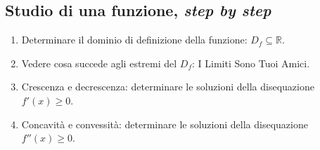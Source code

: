 \documentclass[12pt,a4paper]{article}
\begin{document}
\subsection{Studio di una funzione, \textit{step by step}}
\begin{enumerate}
\item   Determinare il dominio di definizione della funzione: 
        $D_f \subseteq \mathbb{R}$.
\item   Vedere cosa succede agli estremi del $D_f$: I Limiti Sono Tuoi Amici.
\item   Crescenza e decrescenza: determinare le soluzioni della disequazione
        $f'(x) \geq 0$.
\item   Concavit\`a e convessit\`a: determinare le soluzioni della
        disequazione $f''(x) \geq 0$.
\end{enumerate}
\end{document}
